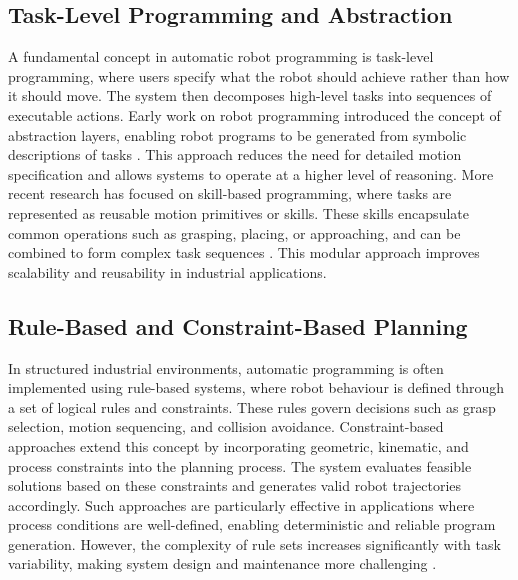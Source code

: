 \subsection{Task-Level Programming and Abstraction}
A fundamental concept in automatic robot programming is task-level programming, where users specify what the robot should achieve rather than how it should move. The system then decomposes high-level tasks into sequences of executable actions.
Early work on robot programming introduced the concept of abstraction layers, enabling robot programs to be generated from symbolic descriptions of tasks \cite{LozanoPerez1983}. This approach reduces the need for detailed motion specification and allows systems to operate at a higher level of reasoning.
More recent research has focused on skill-based programming, where tasks are represented as reusable motion primitives or skills. These skills encapsulate common operations such as grasping, placing, or approaching, and can be combined to form complex task sequences \cite{Kruger2019}. This modular approach improves scalability and reusability in industrial applications.

\subsection{Rule-Based and Constraint-Based Planning}
 
In structured industrial environments, automatic programming is often implemented using rule-based systems, where robot behaviour is defined through a set of logical rules and constraints. These rules govern decisions such as grasp selection, motion sequencing, and collision avoidance.
Constraint-based approaches extend this concept by incorporating geometric, kinematic, and process constraints into the planning process. The system evaluates feasible solutions based on these constraints and generates valid robot trajectories accordingly.
Such approaches are particularly effective in applications where process conditions are well-defined, enabling deterministic and reliable program generation. However, the complexity of rule sets increases significantly with task variability, making system design and maintenance more challenging \cite{Villani2018}.
 

